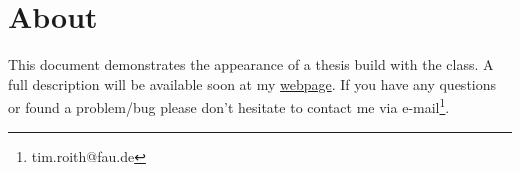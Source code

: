 \chapter{About}\label{ch:One}
This document demonstrates the appearance of a thesis build with the \texttt{\classname} 
class. A full description will be available soon at my
\href{https://timroith.github.io/}{webpage}. 
If you have any questions or found a problem/bug please don't hesitate to contact me 
via e-mail\footnote{tim.roith@fau.de}.
